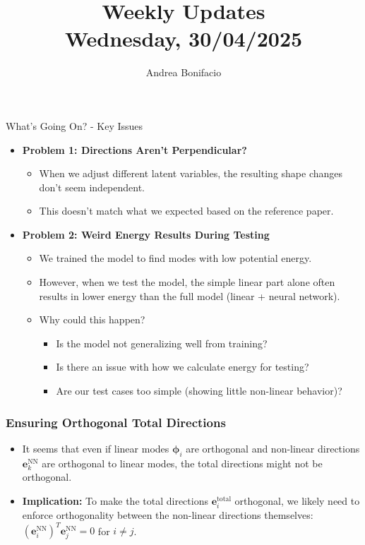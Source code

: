 \documentclass{beamer}
\title{Weekly Updates\\
\tiny{Wednesday, 30/04/2025}}
\author{Andrea Bonifacio}
\date{}
\begin{document}
\begin{frame}
\titlepage
\end{frame}


\begin{frame}{What's Going On? - Key Issues}
    \begin{itemize}
        \item \textbf{Problem 1: Directions Aren't Perpendicular?}
        \begin{itemize}
            \item When we adjust different latent variables, the resulting shape changes don't seem independent.
            \item This doesn't match what we expected based on the reference paper.
        \end{itemize}
        \item \textbf{Problem 2: Weird Energy Results During Testing}
        \begin{itemize}
            \item We trained the model to find modes with low potential energy.
            \item However, when we test the model, the simple linear part alone often results in lower energy than the full model (linear + neural network). 
            \item Why could this happen?
            \begin{itemize}
                \item Is the model not generalizing well from training?
                \item Is there an issue with how we calculate energy for testing?
                \item Are our test cases too simple (showing little non-linear behavior)?
            \end{itemize}
        \end{itemize}
    \end{itemize}
\end{frame}

\begin{frame}
    \frametitle{Ensuring Orthogonal Total Directions}

    \begin{itemize}
        \item It seems that even if linear modes $\boldsymbol{\phi}_i$ are orthogonal and non-linear directions $\mathbf{e}_k^{\text{NN}}$ are orthogonal to linear modes, the total directions might not be orthogonal.
        \item \textbf{Implication:} To make the total directions $\mathbf{e}_i^{\text{total}}$ orthogonal, we likely need to enforce orthogonality between the non-linear directions themselves: $(\mathbf{e}_i^{\text{NN}})^T \mathbf{e}_j^{\text{NN}} = 0$ for $i \neq j$.
    \end{itemize}

\end{frame}
\end{document}
